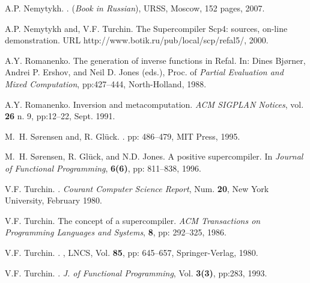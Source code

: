 \documentclass[preprint]{sigplanconf}
\newcommand{\url}{}
\begin{document}
\begin{thebibliography}{}
A.P. Nemytykh. 
     .
     \newblock (\emph{Book in Russian}), URSS, Moscow, 152 pages, 2007.

A.P. Nemytykh and, V.F. Turchin. 
\newblock The Supercompiler Scp4: sources, on-line demonstration. 
\newblock URL \url{http://www.botik.ru/pub/local/scp/refal5/}, 2000. 

A.Y. Romanenko. 
    \newblock The generation of inverse functions in Refal. 
    \newblock In: Dines Bj{\o}rner, Andrei P. Ershov, and Neil D. Jones (eds.), Proc. of       \emph{Partial Evaluation and Mixed Computation}, pp:427--444, North-Holland, 1988.
	
A.Y. Romanenko. 
   \newblock Inversion and metacomputation. 
   \newblock \emph{ACM SIGPLAN Notices}, vol. {\bfseries 26} n. 9, pp:12--22, Sept. 1991. 

M.~H. S{\o}rensen and, R. Gl\"{u}ck.
   . 
   pp: 486--479, {MIT Press}, 1995.

M.~H. S{\o}rensen, R. Gl\"{u}ck, and N.D. Jones.
         \newblock A positive supercompiler. 
         \newblock In \emph{Journal of Functional Programming},
           {\bfseries 6(6)}, pp: 811--838, 1996. 

V.F. Turchin.
       .
       \newblock \emph{Courant Computer Science Report}, Num. {\bfseries 20},
       New York University, February 1980.

V.F. Turchin.
       \newblock The concept of a supercompiler. 
       \newblock \emph{ACM Transactions on Programming Languages and Systems}, 
       {\bfseries 8}, pp: 292--325, 1986.

V.F. Turchin.
       .
       ,
       {LNCS}, Vol. {\bfseries 85}, pp: 645--657, Springer-Verlag, 1980.
       
V.F. Turchin.
       . 
        \newblock \emph{{J. of Functional Programming}},
         Vol. {\bfseries  3(3)},
        pp:{283}, {1993}.
       

\end{thebibliography}
\end{document}
